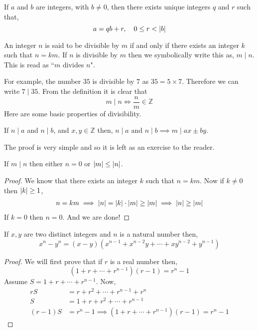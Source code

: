\begin{corollary}
    If $a$ and $b$ are integers, with $b\neq 0$, then there exists unique integers $q$ and $r$ such that,
    \[
        a = qb + r, \quad 0\leq r < \left\lvert b \right\rvert
    \]
\end{corollary}

\begin{definition}
    An integer $n$ is said to be divisible by $m$ if and only if 
    there exists an integer $k$ such that $n = km$. If $n$ is 
    divisible by $m$ then we symbolically write this as, $m \mid n$. 
    This is read as ``$m$ divides $n$".
\end{definition}
For example, the number $35$ is divisible by $7$ as $35 = 5 \times 7$. 
Therefore we can write $7 \mid 35$. From the definition it is clear that 
\[
    m \mid n \iff \frac{n}{m} \in \mathbb{Z}
\]
Here are some basic properties of divisibility.
\begin{theorem}
    If $n \mid a$ and $n \mid b$, and $x,y \in \mathbb{Z}$ then, 
    $n\mid a\text{ and } n\mid b \implies m\mid ax \pm by $.
\end{theorem}
The proof is very simple and so it is left as an exercise to the reader. 

\begin{theorem}
    If $m \mid n$ then either $n=0$ or $\left\lvert m \right\rvert \leq \left\lvert n \right\rvert$.
\end{theorem}
\begin{proof}
    We know that there exists an integer $k$ such that $n = km$. Now if $k\neq 0$ then $\left\lvert k \right\rvert \geq 1$,
    \begin{align*}
        n = km 
        \implies \left\lvert n \right\rvert = \left\lvert k \right\rvert\cdot\left\lvert m \right\rvert \geq \left\lvert m \right\rvert 
        \implies \left\lvert n \right\rvert \geq \left\lvert m \right\rvert
    \end{align*}
    If $k=0$ then $n=0$. And we are done!
\end{proof}

\begin{theorem}
    If $x,y$ are two distinct integers and $n$ is a natural number then, 
    \[
        x^{n} - y^{n} = (x-y)\left(x^{n-1} + x^{n-2}y + \cdots + xy^{n-2} + y^{n-1}\right)
    \]
\end{theorem}
\begin{proof}
    We will first prove that if $r$ is a real number then, 
    \[
        \left(1 + r + \cdots + r^{n-1}\right)\left( r - 1\right) = r^{n} - 1     
    \]
    Assume $S = 1 + r + \cdots + r^{n-1}$. Now,
    \begin{align*}
        rS       & =      r + r^{2} + \cdots + r^{n-1} + r^{n} \\
        S        & = 1 +  r + r^{2} + \cdots + r^{n-1} \\
        (r - 1)S & = r^{n} - 1 \implies \left(1 + r + \cdots + r^{n-1}\right)\left(r - 1\right) = r^{n} - 1
    \end{align*}
\end{proof}



